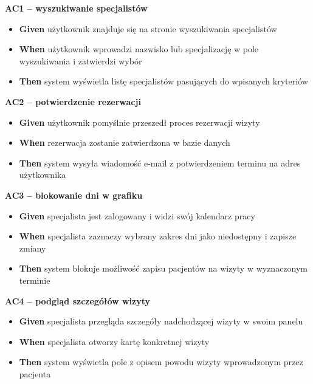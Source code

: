 \documentclass[12pt,a4paper]{article}
\begin{document}
\begin{description}[leftmargin=1.5cm, labelwidth=1cm, labelsep=0.5cm]
\textbf{AC1 -- wyszukiwanie specjalistów}
\begin{itemize}[itemsep=2pt]
    \item \textbf{Given} użytkownik znajduje się na stronie wyszukiwania specjalistów
    \item \textbf{When} użytkownik wprowadzi nazwisko lub specjalizację w pole wyszukiwania i zatwierdzi wybór
    \item \textbf{Then} system wyświetla listę specjalistów pasujących do wpisanych kryteriów
\end{itemize}

\vspace{0.5cm}

\textbf{AC2 -- potwierdzenie rezerwacji}
\begin{itemize}[itemsep=2pt]
    \item \textbf{Given} użytkownik pomyślnie przeszedł proces rezerwacji wizyty
    \item \textbf{When} rezerwacja zostanie zatwierdzona w bazie danych
    \item \textbf{Then} system wysyła wiadomość e-mail z potwierdzeniem terminu na adres użytkownika
\end{itemize}

\vspace{0.5cm}

\textbf{AC3 -- blokowanie dni w grafiku}
\begin{itemize}[itemsep=2pt]
    \item \textbf{Given} specjalista jest zalogowany i widzi swój kalendarz pracy
    \item \textbf{When} specjalista zaznaczy wybrany zakres dni jako niedostępny i zapisze zmiany
    \item \textbf{Then} system blokuje możliwość zapisu pacjentów na wizyty w wyznaczonym terminie
\end{itemize}

\vspace{0.5cm}

\textbf{AC4 -- podgląd szczegółów wizyty}
\begin{itemize}[itemsep=2pt]
    \item \textbf{Given} specjalista przegląda szczegóły nadchodzącej wizyty w swoim panelu
    \item \textbf{When} specjalista otworzy kartę konkretnej wizyty
    \item \textbf{Then} system wyświetla pole z opisem powodu wizyty wprowadzonym przez pacjenta
\end{itemize}


\end{description}
\end{document}
